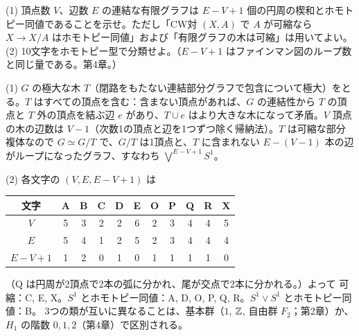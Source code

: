 \begin{problem}[難易度 B]
\begin{center}
\end{center}
(1) 頂点数 $V$、辺数 $E$ の連結な有限グラフは $E-V+1$ 個の円周の楔和とホモトピー同値であることを示せ。ただし「CW対 $(X,A)$ で $A$ が可縮なら $X\to X/A$ はホモトピー同値」および「有限グラフの木は可縮」は用いてよい。\\
(2) 10文字をホモトピー型で分類せよ。（$E-V+1$ はファインマン図のループ数と同じ量である。第4章。）
\end{problem}

\begin{solution}
(1) $G$ の極大な木 $T$（閉路をもたない連結部分グラフで包含について極大）をとる。$T$ はすべての頂点を含む：含まない頂点があれば、$G$ の連結性から $T$ の頂点と $T$ 外の頂点を結ぶ辺 $e$ があり、$T\cup e$ はより大きな木になって矛盾。$V$ 頂点の木の辺数は $V-1$（次数1の頂点と辺を1つずつ除く帰納法）。$T$ は可縮な部分複体なので $G\simeq G/T$ で、$G/T$ は1頂点と、$T$ に含まれない $E-(V-1)$ 本の辺がループになったグラフ、すなわち $\bigvee^{E-V+1}S^1$。

(2) 各文字の $(V,E,E-V+1)$ は
\begin{center}
\begin{tabular}{c|cccccccccc}
文字 & A & B & C & D & E & O & P & Q & R & X\\ \hline
$V$ & 5 & 3 & 2 & 2 & 6 & 2 & 3 & 4 & 4 & 5\\
$E$ & 5 & 4 & 1 & 2 & 5 & 2 & 3 & 4 & 4 & 4\\
$E-V+1$ & 1 & 2 & 0 & 1 & 0 & 1 & 1 & 1 & 1 & 0
\end{tabular}
\end{center}
（Q は円周が2頂点で2本の弧に分かれ、尾が交点で2本に分かれる。）よって
可縮：C, E, X。$S^1$ とホモトピー同値：A, D, O, P, Q, R。$S^1\vee S^1$ とホモトピー同値：B。
3つの類が互いに異なることは、基本群（$1$, $\mathbb{Z}$, 自由群 $F_2$；第2章）か、$H_1$ の階数 $0,1,2$（第4章）で区別される。
\end{solution}

